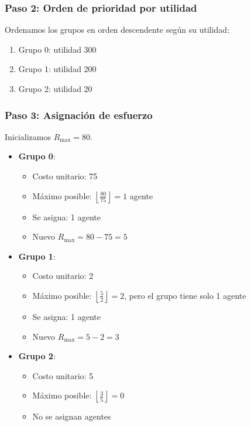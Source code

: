 \documentclass[11pt,letter]{article}
\begin{document}
\subsubsection*{Paso 2: Orden de prioridad por utilidad}

Ordenamos los grupos en orden descendente según su utilidad:

\begin{enumerate}
    \item Grupo 0: utilidad 300
    \item Grupo 1: utilidad 200
    \item Grupo 2: utilidad 20
\end{enumerate}

\subsubsection*{Paso 3: Asignación de esfuerzo}

Inicializamos $R_{\text{max}} = 80$.

\begin{itemize}
    \item \textbf{Grupo 0}:
        \begin{itemize}
            \item Costo unitario: 75
            \item Máximo posible: $\left\lfloor \frac{80}{75} \right\rfloor = 1$ agente
            \item Se asigna: 1 agente
            \item Nuevo $R_{\text{max}} = 80 - 75 = 5$
        \end{itemize}

    \item \textbf{Grupo 1}:
        \begin{itemize}
            \item Costo unitario: 2
            \item Máximo posible: $\left\lfloor \frac{5}{2} \right\rfloor = 2$, pero el grupo tiene solo 1 agente
            \item Se asigna: 1 agente
            \item Nuevo $R_{\text{max}} = 5 - 2 = 3$
        \end{itemize}

    \item \textbf{Grupo 2}:
        \begin{itemize}
            \item Costo unitario: 5
            \item Máximo posible: $\left\lfloor \frac{3}{5} \right\rfloor = 0$
            \item No se asignan agentes
        \end{itemize}
\end{itemize}
\end{document}

